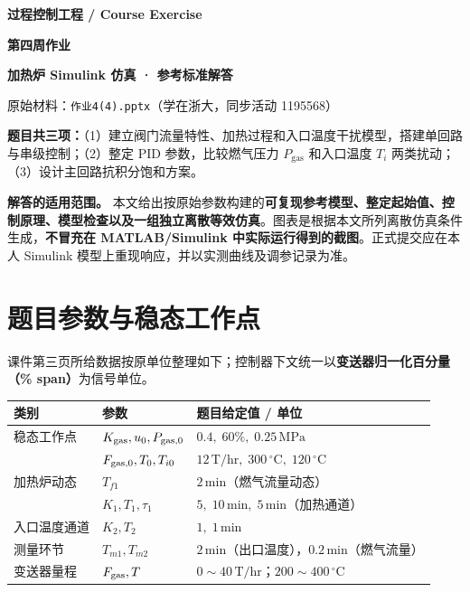 \documentclass[UTF8,a4paper,11pt]{ctexart}
\newcommand{\unit}[1]{\,\mathrm{#1}}
\begin{document}
\thispagestyle{fancy}
\begin{center}
{\large\sffamily\bfseries\color{muted} 过程控制工程 / Course Exercise}\par\vspace{7mm}
{\Huge\sffamily\bfseries\color{ink} 第四周作业}\par\vspace{2mm}
{\LARGE\sffamily\bfseries\color{accent} 加热炉 Simulink 仿真 · 参考标准解答}\par\vspace{5mm}
{\color{muted}\small 原始材料：\texttt{作业4(4).pptx}（学在浙大，同步活动 1195568）}\par
\end{center}
\vspace{4mm}
\begin{notebox}
\textbf{题目共三项：}（1）建立阀门流量特性、加热过程和入口温度干扰模型，搭建单回路与串级控制；（2）整定 PID 参数，比较燃气压力 $P_{\mathrm{gas}}$ 和入口温度 $T_i$ 两类扰动；（3）设计主回路抗积分饱和方案。
\end{notebox}
\vspace{2mm}
\noindent\textbf{解答的适用范围。} 本文给出按原始参数构建的\textbf{可复现参考模型、整定起始值、控制原理、模型检查以及一组独立离散等效仿真}。图表是根据本文所列离散仿真条件生成，\textbf{不冒充在 MATLAB/Simulink 中实际运行得到的截图}。正式提交应在本人 Simulink 模型上重现响应，并以实测曲线及调参记录为准。

\section{题目参数与稳态工作点}
课件第三页所给数据按原单位整理如下；控制器下文统一以\textbf{变送器归一化百分量（\% span）}为信号单位。
\begin{center}
\small
\begin{tabular}{>{\raggedright\arraybackslash}p{.21\linewidth} >{\raggedright\arraybackslash}p{.22\linewidth} >{\raggedright\arraybackslash}p{.44\linewidth}}
\toprule
类别 & 参数 & 题目给定值 / 单位 \\
\midrule
稳态工作点 & $K_{\rm gas},u_0,P_{\rm gas,0}$ & $0.4,\;60\%,\;0.25\unit{MPa}$ \\
& $F_{\rm gas,0}, T_0, T_{i0}$ & $12\unit{T/hr},\;300\unit{^\circ C},\;120\unit{^\circ C}$\\
加热炉动态 & $T_{f1}$ & $2\unit{min}$（燃气流量动态）\\
& $K_1,T_1,\tau_1$ & $5,\;10\unit{min},\;5\unit{min}$（加热通道）\\
入口温度通道 & $K_2,T_2$ & $1,\;1\unit{min}$\\
测量环节 & $T_{m1},T_{m2}$ & $2\unit{min}$（出口温度），$0.2\unit{min}$（燃气流量）\\
变送器量程 & $F_{\rm gas}, T$ & $0\sim40\unit{T/hr}$；$200\sim400\unit{^\circ C}$\\
\bottomrule
\end{tabular}
\end{center}
\end{document}
